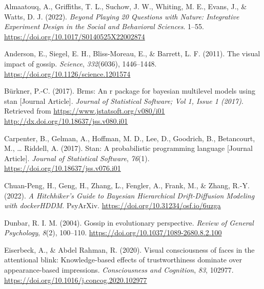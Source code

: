 \documentclass[
  man]{apa6}
\newlength{\cslhangindent}
\newlength{\cslentryspacingunit} %
\newenvironment{CSLReferences}[2] %
 {%
  \setlength{\parindent}{0pt}
  \ifodd #1
  \let\oldpar\par
  \def\par{\hangindent=\cslhangindent\oldpar}
  \fi
  \setlength{\parskip}{#2\cslentryspacingunit}
 }%
 {}
\begin{document}
\hypertarget{refs}{}
\begin{CSLReferences}{1}{0}
\leavevmode{}%
Almaatouq, A., Griffiths, T. L., Suchow, J. W., Whiting, M. E., Evans, J., \& Watts, D. J. (2022). \emph{Beyond {Playing} 20 {Questions} with {Nature}: {Integrative} {Experiment} {Design} in the {Social} and {Behavioral} {Sciences}}. 1--55. \url{https://doi.org/10.1017/S0140525X22002874}

\leavevmode{}%
Anderson, E., Siegel, E. H., Bliss-Moreau, E., \& Barrett, L. F. (2011). The visual impact of gossip. \emph{Science}, \emph{332}(6036), 1446--1448. \url{https://doi.org/10.1126/science.1201574}

\leavevmode{}%
Bürkner, P.-C. (2017). Brms: An r package for bayesian multilevel models using stan {[}Journal Article{]}. \emph{Journal of Statistical Software; Vol 1, Issue 1 (2017)}. Retrieved from \href{https://www.jstatsoft.org/v080/i01\%0Ahttp://dx.doi.org/10.18637/jss.v080.i01}{https://www.jstatsoft.org/v080/i01
http://dx.doi.org/10.18637/jss.v080.i01}

\leavevmode{}%
Carpenter, B., Gelman, A., Hoffman, M. D., Lee, D., Goodrich, B., Betancourt, M., \ldots{} Riddell, A. (2017). Stan: A probabilistic programming language {[}Journal Article{]}. \emph{Journal of Statistical Software}, \emph{76}(1). \url{https://doi.org/10.18637/jss.v076.i01}

\leavevmode{}%
Chuan-Peng, H., Geng, H., Zhang, L., Fengler, A., Frank, M., \& Zhang, R.-Y. (2022). \emph{A {Hitchhiker}'s {Guide} to {Bayesian} {Hierarchical} {Drift}-{Diffusion} {Modeling} with {dockerHDDM}}. PsyArXiv. \url{https://doi.org/10.31234/osf.io/6uzga}

\leavevmode{}%
Dunbar, R. I. M. (2004). Gossip in evolutionary perspective. \emph{Review of General Psychology}, \emph{8}(2), 100--110. \url{https://doi.org/10.1037/1089-2680.8.2.100}

\leavevmode{}%
Eiserbeck, A., \& Abdel Rahman, R. (2020). Visual consciousness of faces in the attentional blink: Knowledge-based effects of trustworthiness dominate over appearance-based impressions. \emph{Consciousness and Cognition}, \emph{83}, 102977. \url{https://doi.org/10.1016/j.concog.2020.102977}


\end{CSLReferences}
\end{document}
